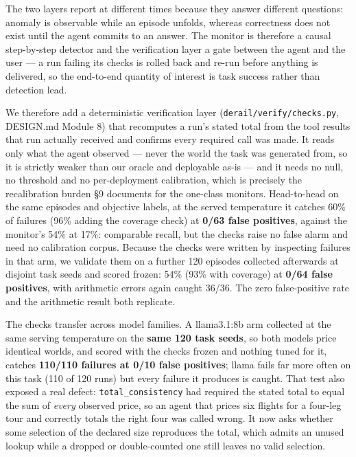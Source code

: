 \documentclass[11pt]{article}
\begin{document}
The two layers report at different times because they answer different questions: anomaly is observable while an episode unfolds, whereas correctness does not exist until the agent commits to an answer. The monitor is therefore a causal step-by-step detector and the verification layer a gate between the agent and the user --- a run failing its checks is rolled back and re-run before anything is delivered, so the end-to-end quantity of interest is task success rather than detection lead.


We therefore add a deterministic verification layer (\texttt{derail/\allowbreak{}verify/\allowbreak{}checks.py}, DESIGN.md Module 8) that recomputes a run's stated total from the tool results that run actually received and confirms every required call was made. It reads only what the agent observed --- never the world the task was generated from, so it is strictly weaker than our oracle and deployable as-is --- and it needs no null, no threshold and no per-deployment calibration, which is precisely the recalibration burden \S{}9 documents for the one-class monitors. Head-to-head on the same episodes and objective labels, at the served temperature it catches 60\% of failures (96\% adding the coverage check) at \textbf{0/63 false positives}, against the monitor's 54\% at 17\%: comparable recall, but the checks raise no false alarm and need no calibration corpus. Because the checks were written by inspecting failures in that arm, we validate them on a further 120 episodes collected afterwards at disjoint task seeds and scored frozen: 54\% (93\% with coverage) at \textbf{0/64 false positives}, with arithmetic errors again caught 36/36. The zero false-positive rate and the arithmetic result both replicate.


The checks transfer across model families. A llama3.1:8b arm collected at the same serving temperature on the \textbf{same 120 task seeds}, so both models price identical worlds, and scored with the checks frozen and nothing tuned for it, catches \textbf{110/110 failures at 0/10 false positives}; llama fails far more often on this task (110 of 120 runs) but every failure it produces is caught. That test also exposed a real defect: \texttt{total\_\allowbreak{}consistency} had required the stated total to equal the sum of \emph{every} observed price, so an agent that prices six flights for a four-leg tour and correctly totals the right four was called wrong. It now asks whether some selection of the declared size reproduces the total, which admits an unused lookup while a dropped or double-counted one still leaves no valid selection.
\end{document}

